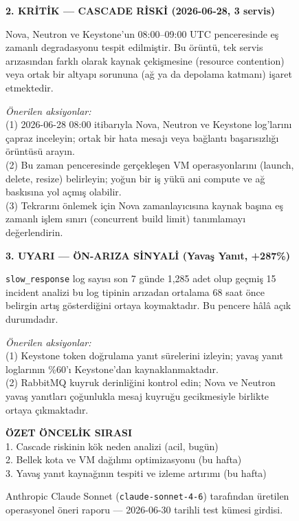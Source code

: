 \begin{figure}[htbp]
\begin{minipage}{0.96\textwidth}
    \medskip

    \textbf{2. KRİTİK — CASCADE RİSKİ (2026-06-28, 3 servis)}

    Nova, Neutron ve Keystone'un 08:00--09:00 UTC penceresinde eş zamanlı degradasyonu tespit edilmiştir.
    Bu örüntü, tek servis arızasından farklı olarak kaynak çekişmesine (resource contention) veya ortak bir altyapı sorununa (ağ ya da depolama katmanı) işaret etmektedir.

    \textit{Önerilen aksiyonlar:}\\
    (1) 2026-06-28 08:00 itibarıyla Nova, Neutron ve Keystone log'larını çapraz inceleyin; ortak bir hata mesajı veya bağlantı başarısızlığı örüntüsü arayın.\\
    (2) Bu zaman penceresinde gerçekleşen VM operasyonlarını (launch, delete, resize) belirleyin; yoğun bir iş yükü ani compute ve ağ baskısına yol açmış olabilir.\\
    (3) Tekrarını önlemek için Nova zamanlayıcısına kaynak başına eş zamanlı işlem sınırı (concurrent build limit) tanımlamayı değerlendirin.

    \medskip

    \textbf{3. UYARI — ÖN-ARIZA SİNYALİ (Yavaş Yanıt, +287\%)}

    \texttt{slow\_response} log sayısı son 7 günde 1{,}285 adet olup geçmiş 15 incident analizi bu log tipinin arızadan ortalama 68 saat önce belirgin artış gösterdiğini ortaya koymaktadır.
    Bu pencere hâlâ açık durumdadır.

    \textit{Önerilen aksiyonlar:}\\
    (1) Keystone token doğrulama yanıt sürelerini izleyin; yavaş yanıt loglarının \%60'ı Keystone'dan kaynaklanmaktadır.\\
    (2) RabbitMQ kuyruk derinliğini kontrol edin; Nova ve Neutron yavaş yanıtları çoğunlukla mesaj kuyruğu gecikmesiyle birlikte ortaya çıkmaktadır.

    \medskip

    \textbf{ÖZET ÖNCELİK SIRASI}\\
    1. Cascade riskinin kök neden analizi (acil, bugün)\\
    2. Bellek kota ve VM dağılımı optimizasyonu (bu hafta)\\
    3. Yavaş yanıt kaynağının tespiti ve izleme artırımı (bu hafta)

    \end{minipage}
    \caption{Anthropic Claude Sonnet (\texttt{claude-sonnet-4-6}) tarafından üretilen operasyonel öneri raporu — 2026-06-30 tarihli test kümesi girdisi.}
    \label{fig:llm-output}
\end{figure}


